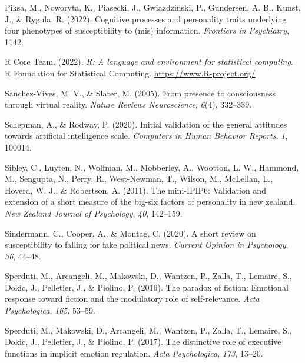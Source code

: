 \documentclass[
  man,floatsintext]{apa6}
\newlength{\cslhangindent}
\newlength{\cslentryspacingunit} %
\newenvironment{CSLReferences}[2] %
 {%
  \setlength{\parindent}{0pt}
  \ifodd #1
  \let\oldpar\par
  \def\par{\hangindent=\cslhangindent\oldpar}
  \fi
  \setlength{\parskip}{#2\cslentryspacingunit}
 }%
 {}
\begin{document}
\begin{CSLReferences}{1}{0}
\leavevmode{}%
Piksa, M., Noworyta, K., Piasecki, J., Gwiazdzinski, P., Gundersen, A. B., Kunst, J., \& Rygula, R. (2022). Cognitive processes and personality traits underlying four phenotypes of susceptibility to (mis) information. \emph{Frontiers in Psychiatry}, 1142.

\leavevmode{}%
R Core Team. (2022). \emph{R: A language and environment for statistical computing}. R Foundation for Statistical Computing. \url{https://www.R-project.org/}

\leavevmode{}%
Sanchez-Vives, M. V., \& Slater, M. (2005). From presence to consciousness through virtual reality. \emph{Nature Reviews Neuroscience}, \emph{6}(4), 332--339.

\leavevmode{}%
Schepman, A., \& Rodway, P. (2020). Initial validation of the general attitudes towards artificial intelligence scale. \emph{Computers in Human Behavior Reports}, \emph{1}, 100014.

\leavevmode{}%
Sibley, C., Luyten, N., Wolfman, M., Mobberley, A., Wootton, L. W., Hammond, M., Sengupta, N., Perry, R., West-Newman, T., Wilson, M., McLellan, L., Hoverd, W. J., \& Robertson, A. (2011). The mini-IPIP6: Validation and extension of a short measure of the big-six factors of personality in new zealand. \emph{New Zealand Journal of Psychology}, \emph{40}, 142--159.

\leavevmode{}%
Sindermann, C., Cooper, A., \& Montag, C. (2020). A short review on susceptibility to falling for fake political news. \emph{Current Opinion in Psychology}, \emph{36}, 44--48.

\leavevmode{}%
Sperduti, M., Arcangeli, M., Makowski, D., Wantzen, P., Zalla, T., Lemaire, S., Dokic, J., Pelletier, J., \& Piolino, P. (2016). The paradox of fiction: Emotional response toward fiction and the modulatory role of self-relevance. \emph{Acta Psychologica}, \emph{165}, 53--59.

\leavevmode{}%
Sperduti, M., Makowski, D., Arcangeli, M., Wantzen, P., Zalla, T., Lemaire, S., Dokic, J., Pelletier, J., \& Piolino, P. (2017). The distinctive role of executive functions in implicit emotion regulation. \emph{Acta Psychologica}, \emph{173}, 13--20.


\end{CSLReferences}
\end{document}
